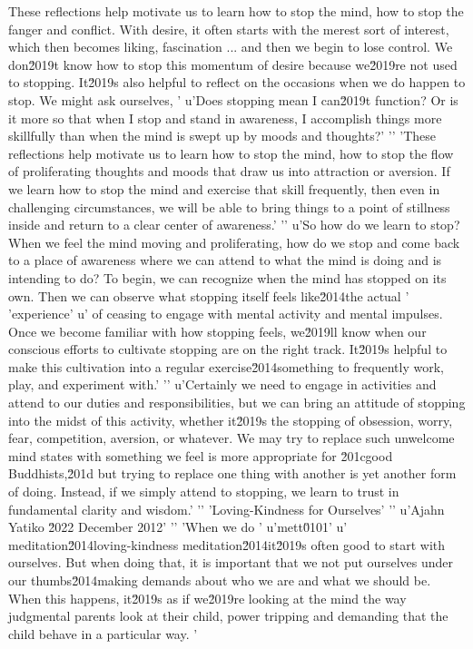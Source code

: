 These reflections help motivate us to learn how to stop the mind, how 
to stop the fanger and conflict. With desire, it often starts with the merest sort of interest, which then becomes liking, fascination ... and then we begin to lose control. We don\u2019t know how to stop this momentum of desire because we\u2019re not used to stopping. It\u2019s also helpful to reflect on the occasions when we do happen to stop. We might ask ourselves, '
u'Does stopping mean I can\u2019t function? Or is it more so that when I stop and stand in awareness, I accomplish things more skillfully than when the mind is swept up by moods and thoughts?'
'\n'
'These reflections help motivate us to learn how to stop the mind, how to stop the flow of proliferating thoughts and moods that draw us into attraction or aversion. If we learn how to stop the mind and exercise that skill frequently, then even in challenging circumstances, we will be able to bring things to a point of stillness inside and return to a clear center of awareness.'
'\n'
u'So how do we learn to stop? When we feel the mind moving and proliferating, how do we stop and come back to a place of awareness where we can attend to what the mind is doing and is intending to do? To begin, we can recognize when the mind has stopped on its own. Then we can observe what stopping itself feels like\u2014the actual '
'experience'
u' of ceasing to engage with mental activity and mental impulses. Once we become familiar with how stopping feels, we\u2019ll know when our conscious efforts to cultivate stopping are on the right track. It\u2019s helpful to make this cultivation into a regular exercise\u2014something to frequently work, play, and experiment with.'
'\n'
u'Certainly we need to engage in activities and attend to our duties and responsibilities, but we can bring an attitude of stopping into the midst of this activity, whether it\u2019s the stopping of obsession, worry, fear, competition, aversion, or whatever. We may try to replace such unwelcome mind states with something we feel is more appropriate for \u201cgood Buddhists,\u201d but trying to replace one thing with another is yet another form of doing. Instead, if we simply attend to stopping, we learn to trust in fundamental clarity and wisdom.'
'\n'
'Loving-Kindness for Ourselves'
'\n'
u'Ajahn Yatiko \u2022 December 2012'
'\n'
'When we do '
u'mett\u0101'
u' meditation\u2014loving-kindness meditation\u2014it\u2019s often good to start with ourselves. But when doing that, it is important that we not put ourselves under our thumbs\u2014making demands about who we are and what we should be. When this happens, it\u2019s as if we\u2019re looking at the mind the way judgmental parents look at their child, power tripping and demanding that the child behave in a particular way. '
